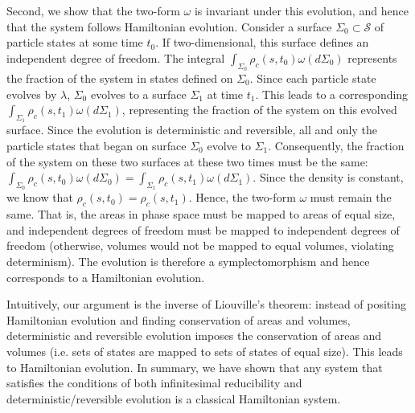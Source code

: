 \documentclass[12pt, english, twoside]{article} %
\begin{document}
Second, we show that the two-form $\omega$ is invariant under this evolution, and hence that the system follows Hamiltonian evolution. Consider a surface $\Sigma_0 \subset \mathcal{S}$ of particle states at some time $t_0$. If two-dimensional, this surface defines an independent degree of freedom. The integral $\int_{\Sigma_0} \rho_c (s, t_0) \omega(d\Sigma_0)$ represents the fraction of the system in states defined on $\Sigma_0$. Since each particle state evolves by $\lambda$, $\Sigma_0$ evolves to a surface $\Sigma_1$ at time $t_1$. This leads to a corresponding $\int_{\Sigma_1} \rho_c (s, t_1) \omega(d\Sigma_1)$, representing the fraction of the system on this evolved surface. Since the evolution is deterministic and reversible, all and only the particle states that began on surface  $\Sigma_0$ evolve to $\Sigma_1$. Consequently, the fraction of the system on these two surfaces at these two times must be the same: $\int_{\Sigma_0} \rho_c (s, t_0) \omega(d\Sigma_0) = \int_{\Sigma_1} \rho_c (s, t_1) \omega(d\Sigma_1)$. Since the density is constant, we know that $\rho_c (s, t_0) = \rho_c (s, t_1)$. Hence, the two-form $\omega$ must remain the same. That is, the areas in phase space must be mapped to areas of equal size, and independent degrees of freedom must be mapped to independent degrees of freedom (otherwise, volumes would not be mapped to equal volumes, violating determinism). The evolution is therefore a symplectomorphism and hence corresponds to a Hamiltonian evolution. 

Intuitively, our argument is the inverse of Liouville's theorem: instead of positing Hamiltonian evolution and finding conservation of areas and volumes, deterministic and reversible evolution imposes the conservation of areas and volumes (i.e. sets of states are mapped to sets of states of equal size). This leads to Hamiltonian evolution. In summary, we have shown that any system that satisfies the conditions of both infinitesimal reducibility and deterministic/reversible evolution is a classical Hamiltonian system.
\end{document}
